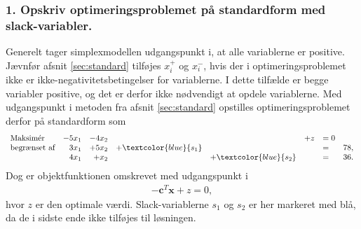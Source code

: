 \subsubsection{1. Opskriv optimeringsproblemet på standardform med slack-variabler.}
%
Generelt tager simplexmodellen udgangspunkt i, at alle variablerne er positive. Jævnfør afsnit \ref{sec:standard} tilføjes $x_i^+$ og $x_i^-$, hvis der i optimeringsproblemet ikke er ikke-negativitetsbetingelser for variablerne. 
I dette tilfælde er begge variabler positive, og det er derfor ikke nødvendigt at opdele variablerne. 
Med udgangspunkt i metoden fra afsnit \ref{sec:standard} opstilles optimeringsproblemet derfor på standardform som
%
\begin{align*}
\begin{array}{lrrrrrlr}
\text{Maksimér}		& -5x_1 &-4x_2 &&& + z & =0\\
\text{begrænset af}	&3x_1& +5x_2	& + \textcolor{blue}{s_1} 	&&&= 	&78,\\
					&4x_1& + x_2	& & + \textcolor{blue}{s_2}	&&=	&	 36.\\
\end{array}
\end{align*}
Dog er objektfunktionen omskrevet med udgangspunkt i 
\begin{align*}
-\textbf{c}^T\textbf{x} + z	 =0,
\end{align*}
hvor $z$ er den optimale værdi. 
%
Slack-variablerne $s_1$ og $s_2$ er her markeret med blå, da de i sidste ende ikke tilføjes til løsningen. 
%
